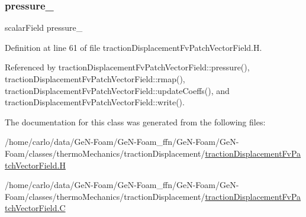 \mbox{\label{classFoam_1_1tractionDisplacementFvPatchVectorField_a753df8fd86b075ec139aaecc1115dacc}} 
\subsubsection{\texorpdfstring{pressure\+\_\+}{pressure\_}}
{\footnotesize\ttfamily scalar\+Field pressure\+\_\+\hspace{0.3cm}{\ttfamily [protected]}}



Definition at line 61 of file traction\+Displacement\+Fv\+Patch\+Vector\+Field.\+H.



Referenced by traction\+Displacement\+Fv\+Patch\+Vector\+Field\+::pressure(), traction\+Displacement\+Fv\+Patch\+Vector\+Field\+::rmap(), traction\+Displacement\+Fv\+Patch\+Vector\+Field\+::update\+Coeffs(), and traction\+Displacement\+Fv\+Patch\+Vector\+Field\+::write().



The documentation for this class was generated from the following files\+:\begin{DoxyCompactItemize}
\item 
/home/carlo/data/\+Ge\+N-\/\+Foam/\+Ge\+N-\/\+Foam\+\_\+ffn/\+Ge\+N-\/\+Foam/\+Ge\+N-\/\+Foam/classes/thermo\+Mechanics/traction\+Displacement/\hyperlink{tractionDisplacementFvPatchVectorField_8H}{traction\+Displacement\+Fv\+Patch\+Vector\+Field.\+H}\item 
/home/carlo/data/\+Ge\+N-\/\+Foam/\+Ge\+N-\/\+Foam\+\_\+ffn/\+Ge\+N-\/\+Foam/\+Ge\+N-\/\+Foam/classes/thermo\+Mechanics/traction\+Displacement/\hyperlink{tractionDisplacementFvPatchVectorField_8C}{traction\+Displacement\+Fv\+Patch\+Vector\+Field.\+C}\end{DoxyCompactItemize}
